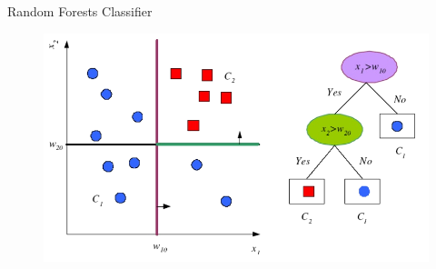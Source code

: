 \documentclass{beamer}
\begin{document}
	\begin{frame}{Random Forests Classifier}
		\begin{figure}
			\includegraphics[width=\textwidth]{dt.png}
		\end{figure}
	\end{frame}
\end{document}
